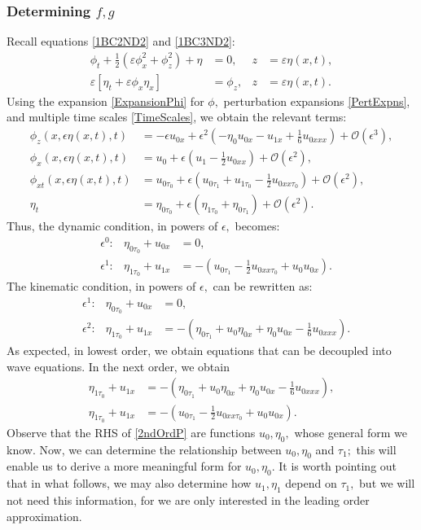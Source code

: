 \documentclass[10pt,reqno,oneside,a4paper]{article}
\begin{document}
\subsubsection*{Determining $f,g$}
Recall equations \eqref{1BC2ND2} and \eqref{1BC3ND2}:
\begin{align*}
\phi_{t} + \frac{1}{2} \left(\varepsilon\phi_{x}^2 + \phi_{z}^2\right) + \eta &= 0, &z &= \varepsilon\eta(x,t),\\
\varepsilon\left[\eta_{t} + \varepsilon \phi_{x} \eta_{x}\right] &= \phi_{z}, &z &= \varepsilon\eta(x,t).
\end{align*}
Using the expansion \eqref{ExpansionPhi} for $\phi,$ perturbation expansions \eqref{PertExpns}, and multiple time scales \eqref{TimeScales}, we obtain the relevant terms:
\begin{align*}
\phi_z(x, \epsilon \eta(x,t), t) &= -\epsilon u_{0x} + \epsilon^2 \left(-\eta_0 u_{0x} - u_{1x} + \frac{1}{6}u_{0xxx} \right) + \mathcal{O}(\epsilon^3), \\
\phi_x(x, \epsilon \eta(x,t), t) &= u_0 + \epsilon(u_1 - \frac{1}{2}u_{0xx}) + \mathcal{O}(\epsilon^2), \\
\phi_{xt}(x, \epsilon \eta(x,t), t) &=u_{0\tau_0} + \epsilon(u_{0\tau_1} + u_{1\tau_0} - \frac{1}{2}u_{0xx\tau_0})+ \mathcal{O}(\epsilon^2), \\
\eta_t &= \eta_{0\tau_0} + \epsilon(\eta_{1\tau_0} + \eta_{0\tau_1}) + \mathcal{O}(\epsilon^2).
\end{align*}
Thus, the dynamic condition, in powers of $\epsilon,$ becomes: 
\begin{align*}
&\epsilon^0: &\eta_{0\tau_0} + u_{0x} &= 0, \\
&\epsilon^1: &\eta_{1\tau_0} + u_{1x} &= - (u_{0\tau_1} -\frac{1}{2} u_{0xx\tau_0} + u_0 u_{0x}). 
\end{align*}
The kinematic condition, in powers of $\epsilon,$ can be rewritten as:
\begin{align*}
&\epsilon^1: &\eta_{0\tau_0} + u_{0x} &= 0, \\
&\epsilon^2: &\eta_{1\tau_0} + u_{1x} &= - (\eta_{0\tau_1} + u_0 \eta_{0x} + \eta_0 u_{0x} - \frac{1}{6}u_{0xxx}).
\end{align*}
As expected, in lowest order, we obtain equations that can be decoupled into wave equations. In the next order, we obtain
\begin{subequations}\label{2ndOrdP}
\begin{align}
\eta_{1\tau_0} + u_{1x} &= - (\eta_{0\tau_1} + u_0 \eta_{0x} + \eta_0 u_{0x} - \frac{1}{6}u_{0xxx}), \label{2ndOrdP1} \\
\eta_{1\tau_0} + u_{1x} &= - (u_{0\tau_1} -\frac{1}{2} u_{0xx\tau_0} + u_0 u_{0x}). \label{2ndOrdP2}
\end{align}
\end{subequations}
Observe that the RHS of \eqref{2ndOrdP} are functions $u_0, \eta_0,$ whose general form we know. Now, we can determine the relationship between $u_0, \eta_0$ and $\tau_1;$ this will enable us to derive a more meaningful form for $u_0, \eta_0.$ It is worth pointing out that in what follows, we may also determine how $u_1, \eta_1$ depend on $\tau_1,$ but we will not need this information, for we are only interested in the leading order approximation.
\end{document}
